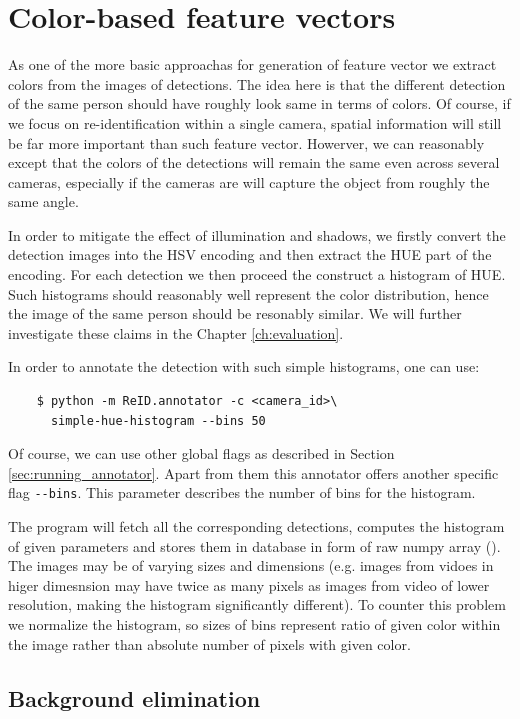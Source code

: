 \section{Color-based feature vectors}

As one of the more basic approachas for generation of feature vector we extract colors
from the images of detections. The idea here is that the different detection of the same
person should have roughly look same in terms of colors. Of course, if we focus on
re-identification within a single camera, spatial information will still be far more
important than such feature vector. Howerver, we can reasonably except that the colors
of the detections will remain the same even across several cameras, especially if the
cameras are will capture the object from roughly the same angle.

In order to mitigate the effect of illumination and shadows, we firstly convert the
detection images into the HSV encoding and then extract the HUE part of the encoding.
For each detection we then proceed the construct a histogram of HUE. Such histograms
should reasonably well represent the color distribution, hence the image of the same
person should be resonably similar. We will further investigate these claims in the 
Chapter \ref{ch:evaluation}.

In order to annotate the detection with such simple histograms, one can use:
\begin{verbatim}
    $ python -m ReID.annotator -c <camera_id>\
      simple-hue-histogram --bins 50
\end{verbatim}

Of course, we can use other global flags as described in Section 
\ref{sec:running_annotator}. Apart from them this annotator offers another specific
flag \verb+--bins+. This parameter describes the number of bins for the histogram.

The program will fetch all the corresponding detections, computes the histogram
of given parameters and stores them in database in form of raw numpy array
(\cite{numpy}). The images may be of varying sizes and dimensions (e.g. images
from vidoes in higer dimesnsion may have twice as many pixels as images from video
of lower resolution, making the histogram significantly different). To counter this
problem we normalize the histogram, so sizes of bins represent ratio of given color
within the image rather than absolute number of pixels with given color.

\subsection{Background elimination}

